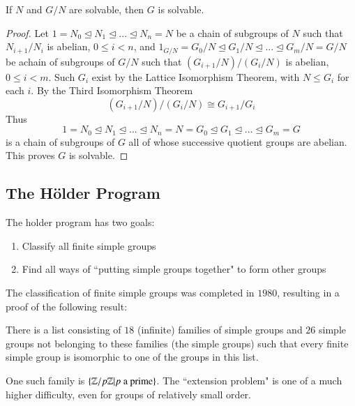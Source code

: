 \documentclass[12pt, a4paper, oneside, openright, titlepage]{book}
\begin{document}
\begin{prop}
    If $N$ and $G/N$ are solvable, then $G$ is solvable.
\end{prop}
\begin{proof}
    Let $1 = N_0 \trianglelefteq N_1 \trianglelefteq ... \trianglelefteq N_n = N$ be a chain of subgroups of $N$ such that $N_{i+1}/N_i$ is abelian, $0 \leq i < n$, and $1_{G/N} = G_0/N\trianglelefteq G_1/N\trianglelefteq ... \trianglelefteq G_m/N = G/N$ be achain of subgroups of $G/N$ such that $(G_{i+1}/N)/(G_i/N)$ is abelian, $0 \leq i < m$. Such $G_i$ exist by the Lattice Isomorphism Theorem, with $N \leq G_i$ for each $i$. By the Third Isomorphism Theorem \begin{equation*}
        (G_{i+1}/N)/(G_i/N) \cong G_{i+1}/G_i
    \end{equation*}
    Thus \begin{equation*}
        1 = N_0 \trianglelefteq N_1 \trianglelefteq ... \trianglelefteq N_n = N = G_0 \trianglelefteq G_1 \trianglelefteq ... \trianglelefteq G_m = G
    \end{equation*}
    is a chain of subgroups of $G$ all of whose successive quotient groups are abelian. This proves $G$ is solvable.
\end{proof}





\subsection{The H\"{o}lder Program}

The holder program has two goals: \begin{enumerate}
    \item Classify all finite simple groups
    \item Find all ways of ``putting simple groups together" to form other groups
\end{enumerate}

The classification of finite simple groups was completed in $1980$, resulting in a proof of the following result:

\begin{thm}
    There is a list consisting of $18$ (infinite) families of simple groups and $26$ simple groups not belonging to these families (the  simple groups) such that every finite simple group is isomorphic to one of the groups in this list.
\end{thm}

One such family is $\{\mathbb Z/p\mathbb Z\vert p\text{ a prime}\}$. The ``extension problem" is one of a much higher difficulty, even for groups of relatively small order.
\end{document}
